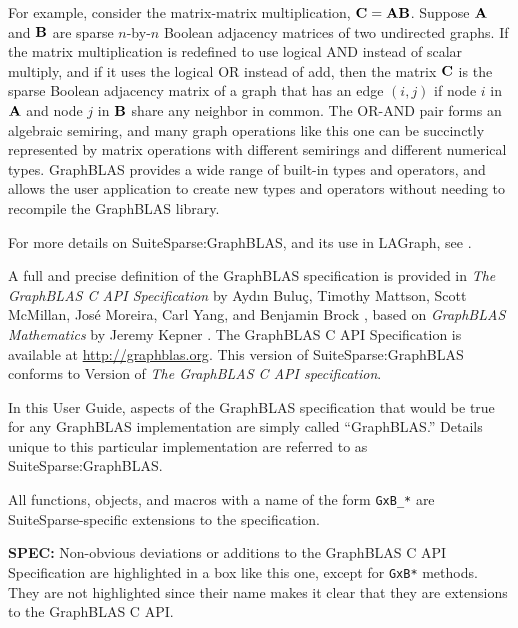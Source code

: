 \documentclass[12pt]{article}
\begin{document}
For example, consider the matrix-matrix multiplication, ${\bf C=AB}$.  Suppose
${\bf A}$ and ${\bf B}$ are sparse $n$-by-$n$ Boolean adjacency matrices of two
undirected graphs.  If the matrix multiplication is redefined to use logical
AND instead of scalar multiply, and if it uses the logical OR instead of add,
then the matrix ${\bf C}$ is the sparse Boolean adjacency matrix of a graph
that has an edge $(i,j)$ if node $i$ in ${\bf A}$ and node $j$ in ${\bf B}$
share any neighbor in common.  The OR-AND pair forms an algebraic semiring, and
many graph operations like this one can be succinctly represented by matrix
operations with different semirings and different numerical types.  GraphBLAS
provides a wide range of built-in types and operators, and allows the user
application to create new types and operators without needing to recompile the
GraphBLAS library.

For more details on SuiteSparse:GraphBLAS, and its use in LAGraph, see
\cite{Davis19,Davis23,Davis18b,DavisAznavehKolodziej19,Davis20,Mattson19}.

A full and precise definition of the GraphBLAS specification is provided in
{\em The GraphBLAS C API Specification} by {Ayd\i n Bulu\c{c}, Timothy Mattson,
Scott McMillan, Jos\'e Moreira, Carl Yang, and Benjamin Brock}
\cite{BulucMattsonMcMillanMoreiraYang17,spec,spec2}, based on {\em GraphBLAS
Mathematics} by Jeremy Kepner \cite{Kepner2017}.  The GraphBLAS C API
Specification is available at \url{http://graphblas.org}.
This version of SuiteSparse:GraphBLAS conforms to Version
 of {\em The GraphBLAS C API specification}.

In this User Guide, aspects of the GraphBLAS specification that would be true
for any GraphBLAS implementation are simply called ``GraphBLAS.'' Details
unique to this particular implementation are referred to as
SuiteSparse:GraphBLAS.

All functions, objects, and macros with a name of the form \verb'GxB_*' are
SuiteSparse-specific extensions to the specification.

\begin{alert}
{\bf SPEC:} Non-obvious deviations or additions to the GraphBLAS C API
Specification are highlighted in a box like this one, except for \verb'GxB*'
methods.  They are not highlighted since their name makes it clear that they
are extensions to the GraphBLAS C API.
\end{alert}


\newpage
\end{document}
